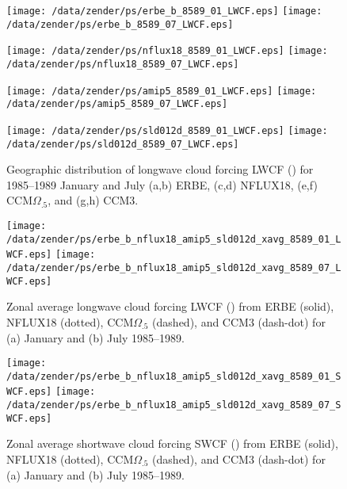 \documentclass[twocolumn,final,11pt]{article}
\begin{document}
\begin{figure*}
\begin{center}
\texttt{[image: /data/zender/ps/erbe\_b\_8589\_01\_LWCF.eps]}%
\texttt{[image: /data/zender/ps/erbe\_b\_8589\_07\_LWCF.eps]}%

\texttt{[image: /data/zender/ps/nflux18\_8589\_01\_LWCF.eps]}%
\texttt{[image: /data/zender/ps/nflux18\_8589\_07\_LWCF.eps]}%

\texttt{[image: /data/zender/ps/amip5\_8589\_01\_LWCF.eps]}%
\texttt{[image: /data/zender/ps/amip5\_8589\_07\_LWCF.eps]}%

\texttt{[image: /data/zender/ps/sld012d\_8589\_01\_LWCF.eps]}%
\texttt{[image: /data/zender/ps/sld012d\_8589\_07\_LWCF.eps]}%
\end{center}
\caption[Geographic distribution of longwave cloud forcing LWCF
for 1985--1989 January and July ERBE, NFLUX18, CCM$\Omega_{.5}$, and CCM3]{
Geographic distribution of longwave cloud forcing LWCF (\wxmS) for
1985--1989 January and July (a,b) ERBE, (c,d) NFLUX18, (e,f)
CCM$\Omega_{.5}$, and (g,h) CCM3.  
\label{fig:8589_LWCF}}   
\end{figure*}
\clearpage

\begin{figure}
\begin{center}
\texttt{[image: /data/zender/ps/erbe\_b\_nflux18\_amip5\_sld012d\_xavg\_8589\_01\_LWCF.eps]}\vfill
\texttt{[image: /data/zender/ps/erbe\_b\_nflux18\_amip5\_sld012d\_xavg\_8589\_07\_LWCF.eps]}\vfill
\end{center}
\caption[Zonal average longwave cloud forcing LWCF from ERBE,
CCM, and ANV for 1985--1989 January and July]{
Zonal average longwave cloud forcing LWCF (\wxmS) from ERBE
(solid), NFLUX18 (dotted), CCM$\Omega_{.5}$ (dashed), and CCM3 (dash-dot)
for (a) January and (b) July 1985--1989. 
\label{fig:xavg_8589_LWCF}}   
\end{figure}

\begin{figure}
\begin{center}
\texttt{[image: /data/zender/ps/erbe\_b\_nflux18\_amip5\_sld012d\_xavg\_8589\_01\_SWCF.eps]}\vfill
\texttt{[image: /data/zender/ps/erbe\_b\_nflux18\_amip5\_sld012d\_xavg\_8589\_07\_SWCF.eps]}\vfill
\end{center}
\caption[Zonal average shortwave cloud forcing SWCF from ERBE,
NFLUX18, CCM$\Omega_{.5}$, and CCM3 for 1985--1989 January and July]{  
Zonal average shortwave cloud forcing SWCF (\wxmS) from ERBE
(solid), NFLUX18 (dotted), CCM$\Omega_{.5}$ (dashed), and CCM3 (dash-dot)
for (a) January and (b) July 1985--1989. 
\label{fig:xavg_8589_SWCF}}   
\end{figure}
\clearpage
\end{document}
